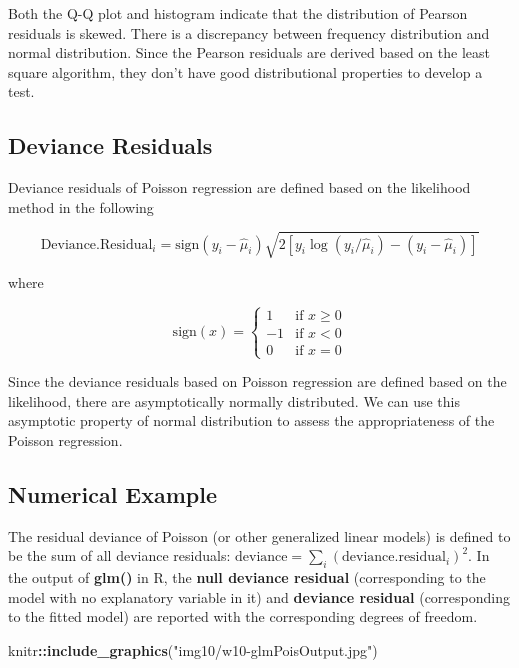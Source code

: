 \documentclass[
]{book}
\newenvironment{Shaded}{\begin{snugshade}}{\end{snugshade}}
\newcommand{\FunctionTok}[1]{\textcolor[rgb]{0.13,0.29,0.53}{\textbf{#1}}}
\newcommand{\NormalTok}[1]{#1}
\newcommand{\SpecialCharTok}[1]{\textcolor[rgb]{0.81,0.36,0.00}{\textbf{#1}}}
\newcommand{\StringTok}[1]{\textcolor[rgb]{0.31,0.60,0.02}{#1}}
\begin{document}
Both the Q-Q plot and histogram indicate that the distribution of Pearson residuals is skewed. There is a discrepancy between frequency distribution and normal distribution. Since the Pearson residuals are derived based on the least square algorithm, they don't have good distributional properties to develop a test.

\hypertarget{deviance-residuals}{%
\subsection{Deviance Residuals}\label{deviance-residuals}}

Deviance residuals of Poisson regression are defined based on the likelihood method in the following

\[
\text{Deviance.Residual}_i=\text{sign}(y_i - \hat{\mu}_i)\sqrt{2\left[y_i\log(y_i/\hat{\mu}_i) -(y_i-\hat{\mu}_i)\right]}
\]

where

\[
\text{sign}(x) = \begin{cases} 
           1    & \text{if } x \geq 0 \\
           - 1  & \text{if } x < 0   \\
           0    & \text{if } x =0
          \end{cases}
\]

Since the deviance residuals based on Poisson regression are defined based on the likelihood, there are asymptotically normally distributed. We can use this asymptotic property of normal distribution to assess the appropriateness of the Poisson regression.

\hfill\break

\hypertarget{numerical-example}{%
\subsection{Numerical Example}\label{numerical-example}}

The residual deviance of Poisson (or other generalized linear models) is defined to be the sum of all deviance residuals: \(\text{deviance} =\sum_i(\text{deviance.residual}_i)^2\). In the output of \textbf{glm()} in R, the \textbf{null deviance residual} (corresponding to the model with no explanatory variable in it) and \textbf{deviance residual} (corresponding to the fitted model) are reported with the corresponding degrees of freedom.

\begin{Shaded}
\begin{Highlighting}[]
\NormalTok{knitr}\SpecialCharTok{::}\FunctionTok{include\_graphics}\NormalTok{(}\StringTok{"img10/w10{-}glmPoisOutput.jpg"}\NormalTok{)}
\end{Highlighting}
\end{Shaded}
\end{document}
